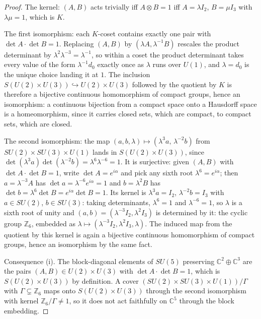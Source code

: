 \documentclass[11pt]{article}
\theoremstyle{definition}
\newcommand{\C}{\mathbb{C}}
\begin{document}
\begin{proof}
The kernel: $(A, B)$ acts trivially iff $A \otimes B = 1$ iff $A = \lambda I_{2}$, $B = \mu I_{3}$ with $\lambda\mu = 1$, which is $K$.

The first isomorphism: each $K$-coset contains exactly one pair with $\det A \cdot \det B = 1$. Replacing $(A, B)$ by $(\lambda A, \lambda^{-1}B)$ rescales the product determinant by $\lambda^{2}\lambda^{-3} = \lambda^{-1}$, so within a coset the product determinant takes every value of the form $\lambda^{-1}d_{0}$ exactly once as $\lambda$ runs over $U(1)$, and $\lambda = d_{0}$ is the unique choice landing it at $1$. The inclusion $S(U(2) \times U(3)) \hookrightarrow U(2) \times U(3)$ followed by the quotient by $K$ is therefore a bijective continuous homomorphism of compact groups, hence an isomorphism: a continuous bijection from a compact space onto a Hausdorff space is a homeomorphism, since it carries closed sets, which are compact, to compact sets, which are closed.

The second isomorphism: the map $(a, b, \lambda) \mapsto (\lambda^{3}a,\, \lambda^{-2}b)$ from $SU(2) \times SU(3) \times U(1)$ lands in $S(U(2) \times U(3))$, since $\det(\lambda^{3}a)\det(\lambda^{-2}b) = \lambda^{6}\lambda^{-6} = 1$. It is surjective: given $(A, B)$ with $\det A \cdot \det B = 1$, write $\det A = e^{i\alpha}$ and pick any sixth root $\lambda^{6} = e^{i\alpha}$; then $a = \lambda^{-3}A$ has $\det a = \lambda^{-6}e^{i\alpha} = 1$ and $b = \lambda^{2}B$ has $\det b = \lambda^{6}\det B = e^{i\alpha}\det B = 1$. Its kernel is $\lambda^{3}a = I_{2}$, $\lambda^{-2}b = I_{3}$ with $a \in SU(2)$, $b \in SU(3)$: taking determinants, $\lambda^{6} = 1$ and $\lambda^{-6} = 1$, so $\lambda$ is a sixth root of unity and $(a, b) = (\lambda^{-3}I_{2}, \lambda^{2}I_{3})$ is determined by it: the cyclic group $\mathbb{Z}_{6}$, embedded as $\lambda \mapsto (\lambda^{-3}I_{2}, \lambda^{2}I_{3}, \lambda)$. The induced map from the quotient by this kernel is again a bijective continuous homomorphism of compact groups, hence an isomorphism by the same fact.

Consequence (i). The block-diagonal elements of $SU(5)$ preserving $\C^{2} \oplus \C^{3}$ are the pairs $(A, B) \in U(2) \times U(3)$ with $\det A \cdot \det B = 1$, which is $S(U(2) \times U(3))$ by definition. A cover $(SU(2) \times SU(3) \times U(1))/\Gamma$ with $\Gamma \subsetneq \mathbb{Z}_{6}$ maps onto $S(U(2) \times U(3))$ through the second isomorphism with kernel $\mathbb{Z}_{6}/\Gamma \neq 1$, so it does not act faithfully on $\C^{5}$ through the block embedding.


\end{proof}
\end{document}
